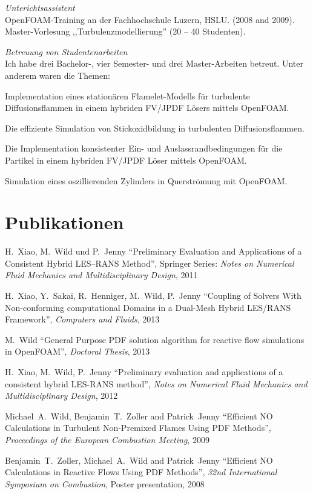 \documentclass[line,11pt,a4paper]{../resume}
\begin{document}
\begin{resume}
\textsl{Unterichtsassistent}\\
OpenFOAM-Training an der Fachhochschule Luzern, HSLU. (2008 and 2009). \\
Master-Vorlesung ,,Turbulenzmodellierung'' (20 -- 40 Studenten).

\textsl{Betreuung von Studentenarbeiten}\\
Ich habe drei Bachelor-, vier Semester- und drei Master-Arbeiten betreut. Unter
anderem waren die Themen:
\begin{list2}
  \item Implementation eines stationären Flamelet-Modells für turbulente
    Diffusionsflammen in einem hybriden FV/JPDF Lösers mittels OpenFOAM.
  \item Die effiziente Simulation von Stickoxidbildung in turbulenten
    Diffusionsflammen.
  \item Die Implementation konsistenter Ein- und Auslassrandbedingungen für
    die Partikel in einem hybriden FV/JPDF Löser mittels OpenFOAM.
  \item Simulation eines oszillierenden Zylinders in Querströmung mit
    OpenFOAM.
\end{list2}

\pagebreak
\section{\mysidestyle Publikationen}\vspace{2mm}
H.~Xiao, M.~Wild und P.~Jenny ``Preliminary Evaluation and
Applications of a Consistent Hybrid LES--RANS Method'', Springer Series:
\textsl{Notes on Numerical Fluid Mechanics and Multidisciplinary Design}, 2011

\vspace{-2mm}
H.~Xiao, Y.~Sakai, R.~Henniger, M.~Wild, P.~Jenny
``Coupling of Solvers With Non-conforming computational Domains in a Dual-Mesh
Hybrid LES/RANS Framework'', \textsl{Computers and Fluids}, 2013

M.~Wild
``General Purpose PDF solution algorithm for reactive flow simulations in
OpenFOAM'', \textsl{Doctoral Thesis}, 2013

\vspace{-2mm}
H.~Xiao, M.~Wild, P.~Jenny
``Preliminary evaluation and applications of a consistent hybrid LES-RANS
method'', \textsl{Notes on Numerical Fluid Mechanics and Multidisciplinary
Design}, 2012

\vspace{-2mm}
Michael~A.~Wild, Benjamin~T.~Zoller and Patrick~Jenny
``Efficient $\mathrm{NO}$ Calculations in Turbulent Non-Premixed Flames Using
PDF Methods'', \textsl{Proceedings of the European Combustion Meeting}, 2009

\vspace{-2mm}
Benjamin~T.~Zoller, Michael~A.~Wild and Patrick~Jenny
``Efficient $\mathrm{NO}$ Calculations in Reactive Flows Using PDF Methods'',
\textsl{32nd International Symposium on Combustion}, Poster presentation, 2008



\end{resume}
\end{document}
